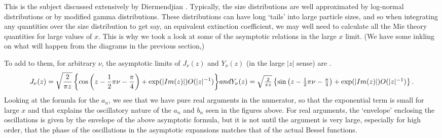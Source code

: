 \documentclass[12pt]{article}
\begin{document}
This is the subject discussed extensively by Diermendjian \cite{Deirmendjian:Miebib}. Typically, the size distributions are well approximated by log-normal distributions or by modified gamma distributions. These distributions can have long `tails' into large particle sizes, and so when integrating any quantities over the size distribution to get say, an equivalent extinction coefficient, we may well need to calculate all the Mie theory quantities for large values of $x$. This is why we took a look at some of the asymptotic relations in the large $x$ limit. (We have some inkling on what will happen from the diagrams in 
the previous section,)

To add to them, for arbitrary $\nu$, the asymptotic limits of $J_\nu(z)$ and 
$Y_\nu (z)$ (in the large $\vert z \vert $ sense) are \cite{AbramowitzStegun:Miebib}.
\begin{equation}
J_\nu(z)=\sqrt{ \frac{2}{\pi z}}
   \left \lbrace
       \cos \left (z-\frac{1}{2} \pi \nu -\frac{\pi}{4} \right )
       +\exp( \vert Im(z) \vert)  O ( \vert z \vert^{-1} )
    \right \rbrace
$$   and $$
Y_\nu(z)=\sqrt{ \frac{2}{\pi z}}
   \left \lbrace
       \sin \left (z-\frac{1}{2} \pi \nu -\frac{\pi}{4} \right )
       +\exp( \vert Im(z) \vert) O ( \vert  z\vert^{-1} )
    \right \rbrace.
\end{equation}
Looking at the formula for the $a_n$, we see that we have pure real arguments
in the numerator, so that the exponential term is small for large $x$ and that
 explains the oscillatory nature of the $a_n$ and $b_n$ seen in the figures 
above. For real arguments, the `envelope' enclosing the oscillations is given
by the envelope of the above asymptotic formula, but it is not until the
argument is very large, especially for
 high order, that the phase of the oscillations in the asymptotic expansions
matches that of the actual Bessel functions.
\end{document}

